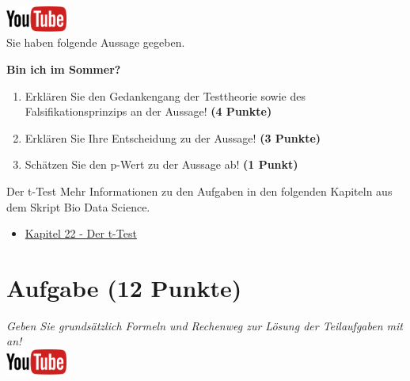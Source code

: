 \documentclass[a4paper, 10pt]{scrartcl}\usepackage[]{graphicx}\usepackage[]{xcolor}
\begin{document}
\hfill\href{https://youtu.be/gQwvMuZ-Sjs}{\includegraphics[width =
  2cm]{img/youtube}}\\[1Ex]



Sie haben folgende Aussage gegeben.

\begin{center}
  \Large\textbf{Bin ich im Sommer?}
\end{center}

\begin{enumerate}
\item Erkl{\"a}ren Sie den Gedankengang der Testtheorie sowie des Falsifikationsprinzips an der Aussage! \textbf{(4 Punkte)}
\item Erkl{\"a}ren Sie Ihre Entscheidung zu der Aussage! \textbf{(3 Punkte)}
\item Sch{\"a}tzen Sie den p-Wert zu der Aussage ab! \textbf{(1 Punkt)}
\end{enumerate}

 
\clearpage
\begin{graybox}{Der t-Test}
Mehr Informationen zu den Aufgaben in den folgenden Kapiteln aus dem Skript Bio Data Science.
  \begin{itemize}
  \item \href{https://jkruppa.github.io/stat-tests-ttest.html}{Kapitel 22 - Der t-Test}
  \end{itemize}
\end{graybox}
\clearpage

\section{Aufgabe \hfill (12 Punkte)}

\textit{Geben Sie grunds{\"a}tzlich Formeln und Rechenweg zur L{\"o}sung der
  Teilaufgaben mit an!} \\[1Ex]

\hfill\href{https://youtu.be/Cq_rF_z4xOk}{\includegraphics[width =
  2cm]{img/youtube}}\\[1Ex]
\end{document}
